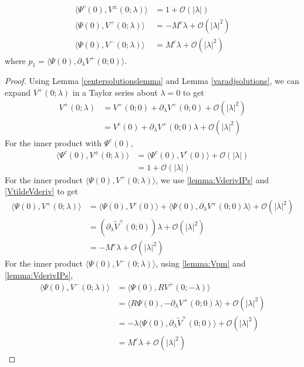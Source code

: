 \documentclass[thesis.tex]{subfiles}
\begin{document}
\begin{corollary}\label{lemma:VpmPsiIP}
\begin{equation}\label{VpmIPs}
\begin{aligned}
\langle \Psi^c(0), V^\pm(0; \lambda) \rangle &= 1 + \mathcal{O}(|\lambda|) \\
\langle \Psi(0), V^+(0; \lambda) \rangle &= -M^c \lambda + \mathcal{O}(|\lambda|^2) \\
\langle \Psi(0), V^-(0; \lambda) \rangle &= M^c \lambda + \mathcal{O}(|\lambda|^2)
\end{aligned}
\end{equation}
where $p_1 = \langle \Psi(0), \partial_\lambda V^+(0; 0) \rangle$.
\begin{proof}
Using Lemma \ref{centersolutionslemma} and Lemma \ref{varadjsolutions}, we can expand $V^+(0; \lambda)$ in a Taylor series about $\lambda = 0$ to get
\begin{align*}
V^+(0; \lambda) &= V^+(0; 0) + \partial_\lambda V^+(0; 0) + \mathcal{O}(|\lambda|^2) \\
&= V^c(0) + \partial_\lambda V^+(0; 0) \lambda + \mathcal{O}(|\lambda|^2) 
\end{align*}
For the inner product with $\Psi^c(0)$,
\begin{align*}
\langle \Psi^c(0), V^\pm(0; \lambda) \rangle &= 
\langle \Psi^c(0), V^c(0) \rangle + \mathcal{O}(|\lambda|) \\
&= 1 + \mathcal{O}(|\lambda|)
\end{align*}
For the inner product $\langle \Psi(0), V^+(0; \lambda) \rangle$, we use \cref{lemma:VderivIPs} and \cref{VtildeVderiv} to get
\begin{align*}
\langle \Psi(0), V^+(0; \lambda) \rangle 
&= \langle \Psi(0), V^c(0) \rangle + \langle \Psi(0), \partial_\lambda V^+(0; 0) \lambda \rangle + \mathcal{O}(|\lambda|^2) \\
&= (\partial_\lambda \tilde{V}^+(0; 0)) \lambda + \mathcal{O}(|\lambda|^2) \\
&= -M^c \lambda + \mathcal{O}(|\lambda|^2)
\end{align*}
For the inner product $\langle \Psi(0), V^-(0; \lambda) \rangle$, using \cref{lemma:Vpm} and \cref{lemma:VderivIPs},
\begin{align*}
\langle \Psi(0), V^-(0; \lambda) \rangle &= 
\langle \Psi(0), R V^+(0; -\lambda) \rangle \\
&= \langle R \Psi(0), -\partial_\lambda V^+(0; 0) \lambda \rangle + \mathcal{O}(|\lambda|^2) \\
&= -\lambda \langle \Psi(0), \partial_\lambda \tilde{V}^+(0; 0) \rangle + \mathcal{O}(|\lambda|^2) \\
&= M^c \lambda + \mathcal{O}(|\lambda|^2)
\end{align*}
\end{proof}
\end{corollary}


\iffulldocument\else
	
	
\fi
\end{document}
